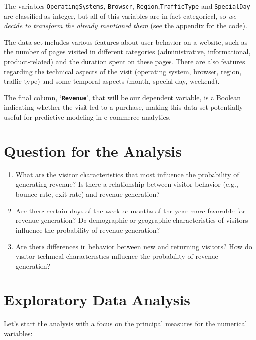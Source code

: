 \documentclass[
]{article}
\begin{document}
The variables \texttt{OperatingSystems}, \texttt{Browser},
\texttt{Region},\texttt{TrafficType} and \texttt{SpecialDay} are
classified as integer, but all of this variables are in fact
categorical, so \emph{we decide to transform the already mentioned them}
(see the appendix for the code).

The data-set includes various features about user behavior on a website,
such as the number of pages visited in different categories
(administrative, informational, product-related) and the duration spent
on these pages. There are also features regarding the technical aspects
of the visit (operating system, browser, region, traffic type) and some
temporal aspects (month, special day, weekend).

The final column, `\textbf{\texttt{Revenue}}', that will be our
dependent variable, is a Boolean indicating whether the visit led to a
purchase, making this data-set potentially useful for predictive
modeling in e-commerce analytics.

\section{Question for the Analysis}\label{question-for-the-analysis}

\begin{enumerate}
\def\labelenumi{\arabic{enumi}.}
\item
  What are the visitor characteristics that most influence the
  probability of generating revenue? Is there a relationship between
  visitor behavior (e.g., bounce rate, exit rate) and revenue
  generation?
\item
  Are there certain days of the week or months of the year more
  favorable for revenue generation? Do demographic or geographic
  characteristics of visitors influence the probability of revenue
  generation?
\item
  Are there differences in behavior between new and returning visitors?
  How do visitor technical characteristics influence the probability of
  revenue generation?
\end{enumerate}

\newpage

\section{Exploratory Data Analysis}\label{exploratory-data-analysis}

Let's start the analysis with a focus on the principal measures for the
numerical variables:
\end{document}
